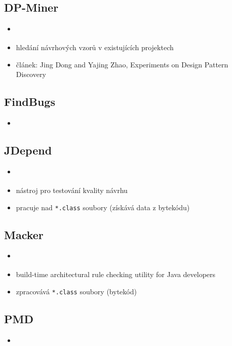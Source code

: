 \subsection{DP-Miner}
\begin{itemize}
\item \cite{existingtools:dp-miner}
\item hledání návrhových vzorů v existujících projektech
\item článek: Jing Dong and Yajing Zhao, Experiments on Design Pattern Discovery \cite{4273268}
\end{itemize}

\subsection{FindBugs}
\begin{itemize}
\item \cite{existingtools:findbugs}
\end{itemize}

\subsection{JDepend}
\begin{itemize}
\item \cite{existingtools:jdepend}
\item nástroj pro testování kvality návrhu
\item pracuje nad \verb+*.class+ soubory (získává data z bytekódu)
\end{itemize}

\subsection{Macker}
\begin{itemize}
\item \cite{existingtools:macker}
\item build-time architectural rule checking utility for Java developers
\item zpracovává \verb+*.class+ soubory (bytekód)
\end{itemize}

\subsection{PMD}
\begin{itemize}
\item \cite{existingtools:pmd}
\end{itemize}

